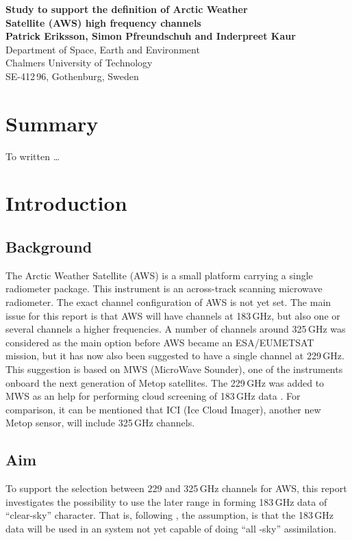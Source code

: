 \documentclass[12pt]{article}
\begin{document}
\thispagestyle{empty}
\noindent
\textbf{\Large Study to support the definition of Arctic Weather \vspace{1mm}\\
Satellite (AWS) high frequency channels} \vspace{8mm}\\
{\bf Patrick Eriksson, Simon Pfreundschuh and Inderpreet Kaur}\\
Department of Space, Earth and Environment\\
Chalmers University of Technology\\
SE-412\,96, Gothenburg, Sweden \vspace{10mm}

\section*{Summary}
%
To written \dots



\setcounter{tocdepth}{1} 
\tableofcontents


\newpage
\setcounter{page}{1}

\section{Introduction}
%
\subsection{Background}
The Arctic Weather Satellite (AWS) is a small platform carrying a single
radiometer package. This instrument is an across-track scanning microwave
radiometer. The exact channel configuration of AWS is not yet set. The main
issue for this report is that AWS will have channels at 183\,GHz, but also one
or several channels a higher frequencies. A number of channels around 325\,GHz
was considered as the main option before AWS became an ESA/EUMETSAT mission,
but it has now also been suggested to have a single channel at 229\,GHz. This
suggestion is based on MWS (MicroWave Sounder), one of the instruments onboard
the next generation of Metop satellites. The 229\,GHz was added to MWS as an
help for performing cloud screening of 183\,GHz data
\citep{rekha2012potential}. For comparison, it can be mentioned that ICI (Ice
Cloud Imager), another new Metop sensor, will include 325\,GHz channels.

\subsection{Aim}
%
To support the selection between 229 and 325\,GHz channels for AWS, this report
investigates the possibility to use the later range in forming 183\,GHz data of
``clear-sky'' character. That is, following \citet{rekha2012potential}, the
assumption, is that the 183\,GHz data will be used in an system not yet
capable of doing ``all -sky'' assimilation.
\end{document}
